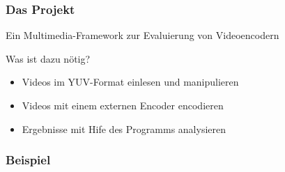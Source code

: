 \documentclass[t]{beamer}
\begin{document}
\begin{frame}
	\frametitle{Das Projekt}
	\begin{center}
		Ein Multimedia-Framework zur Evaluierung von Videoencodern	
	\end{center}
	 Was ist dazu nötig? \newline
	\begin{itemize}
		\item<1-> Videos im YUV-Format einlesen und manipulieren
		\item<2-> Videos mit einem externen Encoder encodieren
		\item<3-> Ergebnisse mit Hife des Programms analysieren
	\end{itemize}
\end{frame}

\begin{frame}
	\frametitle{Beispiel}


\end{frame}
\end{document}
